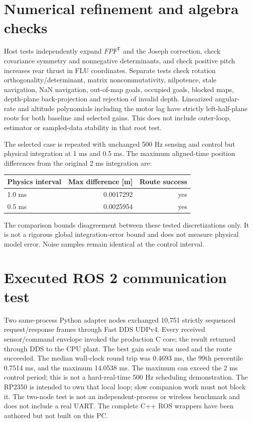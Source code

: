 \section{Numerical refinement and algebra checks}
Host tests independently expand $FPF^{\mathsf T}$ and the Joseph correction,
check covariance symmetry and nonnegative determinants, and check positive
pitch increases rear thrust in FLU coordinates. Separate tests check rotation
orthogonality/determinant, matrix noncommutativity, nilpotence, stale navigation,
NaN navigation, out-of-map goals, occupied goals, blocked maps, depth-plane
back-projection and rejection of invalid depth. Linearized angular-rate and
altitude polynomials including the motor lag have strictly left-half-plane roots
for both baseline and selected gains. This does not include outer-loop,
estimator or sampled-data stability in that root test.

The selected case is repeated with unchanged 500 Hz sensing and control but
physical integration at 1 ms and 0.5 ms. The maximum aligned-time position
differences from the original 2 ms integration are:
\begin{center}\begin{tabular}{lrr}\toprule Physics interval & Max difference [m] & Route success\\\midrule
1.0 ms & 0.0017292 & yes\\
0.5 ms & 0.0025954 & yes\\
\bottomrule\end{tabular}\end{center}
The comparison bounds disagreement between these tested discretizations only.
It is not a rigorous global integration-error bound and does not measure
physical model error. Noise samples remain identical at the control interval.

\section{Executed ROS 2 communication test}
Two same-process Python adapter nodes exchanged 10,751 strictly sequenced request/response frames through Fast DDS UDPv4. Every received sensor/command envelope invoked the production C core; the result returned through DDS to the CPU plant. The best gain scale was used and the route succeeded. The median wall-clock round trip was 0.4693 ms, the 99th percentile 0.7514 ms, and the maximum 14.0538 ms.
The maximum can exceed the 2 ms control period; this is not a hard-real-time
500 Hz scheduling demonstration. The RP2350 is intended to own that local
loop; slow companion work must not block it. The two-node test is not an
independent-process or wireless benchmark and does not include a real UART.
The complete C++ ROS wrappers have been authored but not built on this PC.

